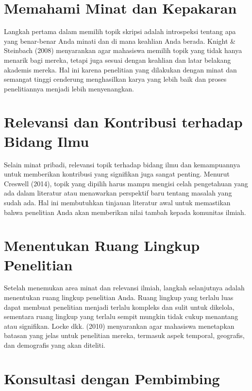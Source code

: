\documentclass[
  indonesian,
  letterpaper,
]{scrbook}
\begin{document}
\section{Memahami Minat dan
Kepakaran}\label{memahami-minat-dan-kepakaran}

Langkah pertama dalam memilih topik skripsi adalah introspeksi tentang
apa yang benar-benar Anda minati dan di mana keahlian Anda berada.
Knight \& Steinbach (2008) menyarankan agar mahasiswa memilih topik yang
tidak hanya menarik bagi mereka, tetapi juga sesuai dengan keahlian dan
latar belakang akademis mereka. Hal ini karena penelitian yang dilakukan
dengan minat dan semangat tinggi cenderung menghasilkan karya yang lebih
baik dan proses penelitiannya menjadi lebih menyenangkan.

\section{Relevansi dan Kontribusi terhadap Bidang
Ilmu}\label{relevansi-dan-kontribusi-terhadap-bidang-ilmu}

Selain minat pribadi, relevansi topik terhadap bidang ilmu dan
kemampuannya untuk memberikan kontribusi yang signifikan juga sangat
penting. Menurut Creswell (2014), topik yang dipilih harus mampu mengisi
celah pengetahuan yang ada dalam literatur atau menawarkan perspektif
baru tentang masalah yang sudah ada. Hal ini membutuhkan tinjauan
literatur awal untuk memastikan bahwa penelitian Anda akan memberikan
nilai tambah kepada komunitas ilmiah.

\section{Menentukan Ruang Lingkup
Penelitian}\label{menentukan-ruang-lingkup-penelitian}

Setelah menemukan area minat dan relevansi ilmiah, langkah selanjutnya
adalah menentukan ruang lingkup penelitian Anda. Ruang lingkup yang
terlalu luas dapat membuat penelitian menjadi terlalu kompleks dan sulit
untuk dikelola, sementara ruang lingkup yang terlalu sempit mungkin
tidak cukup menantang atau signifikan. Locke dkk. (2010) menyarankan
agar mahasiswa menetapkan batasan yang jelas untuk penelitian mereka,
termasuk aspek temporal, geografis, dan demografis yang akan diteliti.

\section{Konsultasi dengan
Pembimbing}\label{konsultasi-dengan-pembimbing}
\end{document}

